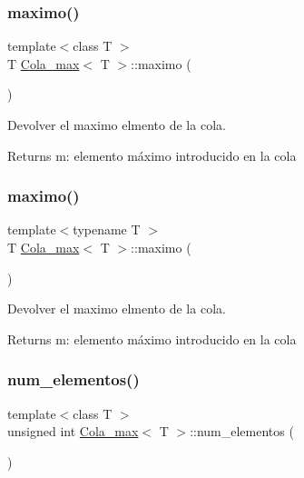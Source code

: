 \subsubsection{\texorpdfstring{maximo()}{maximo()}\hspace{0.1cm}{\footnotesize\ttfamily [1/2]}}
{\footnotesize\ttfamily template$<$class T $>$ \\
T \mbox{\hyperlink{class_cola__max}{Cola\+\_\+max}}$<$ T $>$\+::maximo (\begin{DoxyParamCaption}{ }\end{DoxyParamCaption})}



Devolver el maximo elmento de la cola. 

\begin{DoxyReturn}{Returns}
m\+: elemento máximo introducido en la cola 
\end{DoxyReturn}
\mbox{\label{class_cola__max_a3df6075351dfd7c9e9a436a6d430e170}} 
\subsubsection{\texorpdfstring{maximo()}{maximo()}\hspace{0.1cm}{\footnotesize\ttfamily [2/2]}}
{\footnotesize\ttfamily template$<$typename T $>$ \\
T \mbox{\hyperlink{class_cola__max}{Cola\+\_\+max}}$<$ T $>$\+::maximo (\begin{DoxyParamCaption}{ }\end{DoxyParamCaption})}



Devolver el maximo elmento de la cola. 

\begin{DoxyReturn}{Returns}
m\+: elemento máximo introducido en la cola 
\end{DoxyReturn}
\mbox{\label{class_cola__max_aa3ece318ef28ed910c378f33e9a1d172}} 
\subsubsection{\texorpdfstring{num\+\_\+elementos()}{num\_elementos()}\hspace{0.1cm}{\footnotesize\ttfamily [1/2]}}
{\footnotesize\ttfamily template$<$class T $>$ \\
unsigned int \mbox{\hyperlink{class_cola__max}{Cola\+\_\+max}}$<$ T $>$\+::num\+\_\+elementos (\begin{DoxyParamCaption}{ }\end{DoxyParamCaption})}



